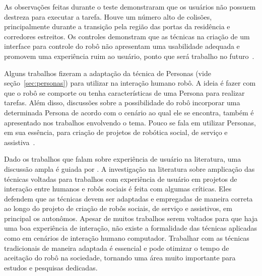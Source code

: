 As observações feitas durante o teste demonstraram que os usuários não possuem destreza para executar a tarefa. Houve um número alto de colisões, principalmente durante a transição pela região das portas da residência e corredores estreitos. Os controles demonstram que as técnicas na criação de um interface para controle do robô não apresentam uma usabilidade adequada e promovem uma experiência ruim ao usuário, ponto que será trabalho no futuro~\cite{mcginn:2017}.

Alguns trabalhos fizeram a adaptação da técnica de Personas (vide seção~\ref{sec:personas}) para utilizar na interação humano robô. A ideia é fazer com que o robô se comporte ou tenha características de uma Persona para realizar tarefas. Além disso, discussões sobre a possibilidade do robô incorporar uma determinada Persona de acordo com o cenário ao qual ele se encontra, também é apresentado nos trabalhos envolvendo o tema. Pouco se fala em utilizar Personas, em sua essência, para criação de projetos de robótica social, de serviço e assistiva~\cite{woods:2005, ljungblad:2006, meerbeek:2009, ruckert:2011, duque:2013, ruckert:2013}.

Dado os trabalhos que falam sobre experiência de usuário na literatura, uma discussão ampla é guiada por . A investigação na literatura sobre amplicação das técnicas voltadas para trabalhos com experiência de usuário em projetos de interação entre humanos e robôs sociais é feita com algumas críticas. Eles defendem que as técnicas devem ser adaptadas e empregadas de maneira correta ao longo do projeto de criação de robôs sociais, de serviço e assistivos, em principal os autonômos. Apesar de muitos trabalhos serem voltados para que haja uma boa experiência de interação, não existe a formalidade das técnicas aplicadas como em cenários de interação humano computador. Trabalhar com as técnicas tradicionais de maneira adaptada é essencial e pode otimizar o tempo de aceitação do robô na sociedade, tornando uma área muito importante para estudos e pesquisas dedicadas.
